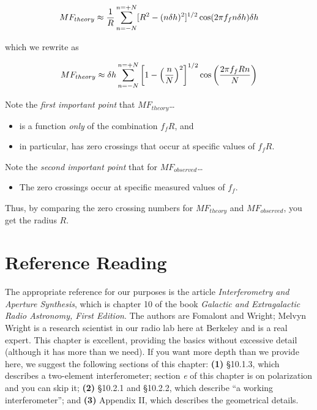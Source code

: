 \documentclass[11pt,preprint]{aastex}
\begin{document}
\begin{equation}
MF_{theory} \approx {1 \over R} \sum_{n=-N}^{n=+N}
[R^2 - (n \delta h)^2]^{1/2} \cos(2 \pi f_f n\delta h) \delta h
\end{equation}

\noindent which we rewrite as

\begin{equation}
MF_{theory} \approx  \delta h \sum_{n=-N}^{n=+N}
\left[ 1 - \left( n \over N\right)^2 \right]^{1/2} 
\cos \left( 2 \pi f_f R n \over N \right)
\end{equation}

\noindent
Note the {\it first important point} that $MF_{theory}$\dots

\begin{itemize}
\item is a function {\it only} of the combination $f_f R$, and
\item in particular, has zero crossings that occur at specific
  values of $f_f R$.
  \end{itemize}

\noindent
  Note the {\it second important point} that for $MF_{observed}$\dots
  \begin{itemize}
    \item The zero crossings occur at specific measured values of
      $f_{f}$. \end{itemize} 

\noindent Thus, by comparing the zero crossing numbers for $MF_{theory}$ and
$MF_{observed}$, you get the radius $R$. 


\section {Reference Reading}

\noindent
	The appropriate reference for our purposes is the article {\it
Interferometry and Aperture Synthesis}, which is chapter 10 of the book
{\it Galactic and Extragalactic Radio Astronomy, First Edition}.  The
authors are Fomalont and Wright; Melvyn Wright is a research scientist
in our radio lab here at Berkeley and is a real expert.  This chapter is
excellent, providing the basics without excessive detail (although it
has more than we need).  If you want more depth than we provide here, we
suggest the following sections of this chapter: {\bf (1)} \S10.1.3,
which describes a two-element interferometer; section {\it e} of this
chapter is on polarization and you can skip it; {\bf (2)} \S10.2.1 and
\S10.2.2, which describe ``a working interferometer''; and {\bf (3)}
Appendix II, which describes the geometrical details. 
\end{document}
